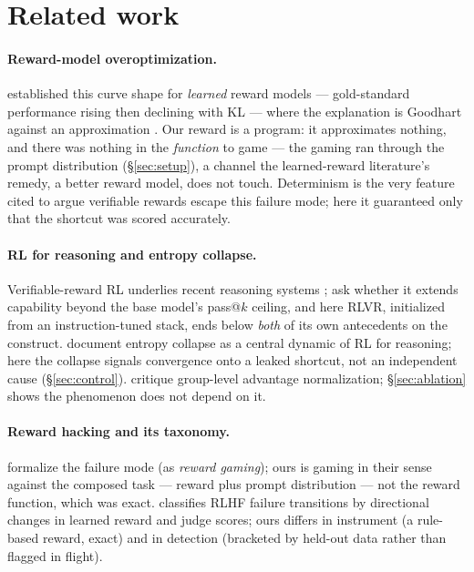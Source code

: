 \documentclass{article}
\begin{document}
\section{Related work}
\label{sec:related}

\paragraph{Reward-model overoptimization.} \citet{gao2023scaling}
established this curve shape for \emph{learned} reward models ---
gold-standard performance rising then declining with KL --- where the
explanation is Goodhart against an approximation \citep{stiennon2020}. Our reward is a program: it approximates nothing, and
there was nothing in the \emph{function} to game --- the gaming ran through
the prompt distribution (\S\ref{sec:setup}), a channel the learned-reward
literature's remedy, a better reward model, does not touch. Determinism is
the very feature cited to argue verifiable rewards escape this failure
mode; here it guaranteed only that the shortcut was scored accurately.

\paragraph{RL for reasoning and entropy collapse.} Verifiable-reward RL
underlies recent reasoning systems \citep{deepseekr1, deepseekmath};
\citet{yue2025} ask whether it extends capability beyond the base model's
pass@$k$ ceiling, and here RLVR, initialized from an instruction-tuned
stack, ends below \emph{both} of its own antecedents on the construct.
\citet{cui2025} document entropy collapse as a central dynamic of RL for
reasoning; here the collapse signals convergence onto a leaked shortcut, not an
independent cause (\S\ref{sec:control}). \citet{drgrpo} critique group-level advantage normalization;
\S\ref{sec:ablation} shows the phenomenon does not depend on it.

\paragraph{Reward hacking and its taxonomy.} \citet{skalse2022}
formalize the failure mode (as \emph{reward gaming}); ours is gaming in
their sense against the composed task --- reward plus prompt distribution
--- not the reward function, which was exact.
\citet{abahana2026} classifies RLHF failure transitions by directional
changes in learned reward and judge scores; ours differs in instrument (a
rule-based reward, exact) and in detection (bracketed by held-out data
rather than flagged in flight).
\end{document}
